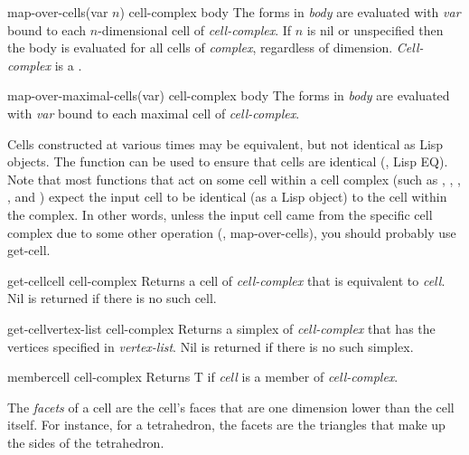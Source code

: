 \begin{macrodef}{map-over-cells}{(var \optional $n$) cell-complex
\body body}
The forms in {\em body} are evaluated with {\em var} bound to each
$n$-dimensional cell of {\em cell-complex}.  If $n$ is {\sf nil} or
unspecified then the body is evaluated for all cells of {\em complex},
regardless of dimension.  {\em Cell-complex} is a .
\end{macrodef}

\begin{macrodef}{map-over-maximal-cells}{(var) cell-complex \body body}
The forms in {\em body} are evaluated with {\em var} bound to each
maximal cell of {\em cell-complex}.
\end{macrodef}

Cells constructed at various times may be equivalent, but not identical
as Lisp objects.  The function  can be used to
ensure that cells are identical (\ie, Lisp {\sf EQ}).  Note that most
functions that act on some cell within a cell complex (such as
, , ,
, and ) expect the
input cell to be identical (as a Lisp object) to the cell within the
complex.  In other words, unless the input cell came from the specific
cell complex due to some other operation (\eg, {\sf map-over-cells}),
you should probably use {\sf get-cell}.

\begin{methoddef}{get-cell}{cell cell-complex}
Returns a cell of {\em cell-complex} that is equivalent to {\em cell}.
{\sf Nil} is returned if there is no such cell.
\end{methoddef}

\begin{methoddef}{get-cell}{vertex-list cell-complex}
Returns a simplex of {\em cell-complex} that has the vertices
specified in {\em vertex-list}.  {\sf Nil} is returned if there is no
such simplex.
\end{methoddef}

\begin{methoddef}{member}{cell cell-complex}
Returns {\sf T} if {\em cell} is a member of {\em cell-complex}.
\end{methoddef}

The {\em facets} of a cell are the cell's faces that are one dimension
lower than the cell itself.  For instance, for a tetrahedron, the
facets are the triangles that make up the sides of the tetrahedron.

